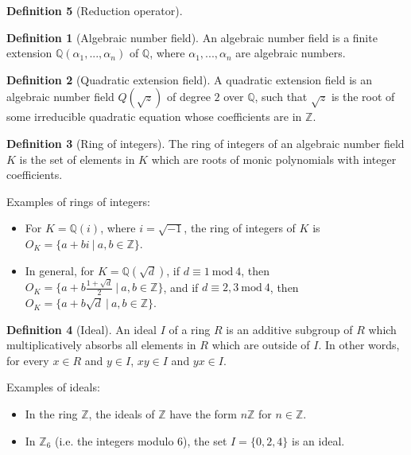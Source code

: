 \documentclass{article}
\theoremstyle{definition}
\newtheorem{definition}{Definition}[section]
\theoremstyle{theorem}
\theoremstyle{example}
\theoremstyle{corollary}
\begin{document}
\begin{definition}[Reduction operator]
\bigskip

\theoremstyle{definition}
\begin{definition}[Algebraic number field]
An algebraic number field is a finite extension \(\mathbb{Q}(\alpha_{1}, . . . , \alpha_{n})\) of \(\mathbb{Q}\), where \(\alpha_{1}, . . . , \alpha_{n}\) are algebraic numbers.
\end{definition}

\bigskip

\theoremstyle{definition}
\begin{definition}[Quadratic extension field]
A quadratic extension field is an algebraic number field \(Q(\sqrt{z})\) of degree \(2\) over \(\mathbb{Q}\), such that \(\sqrt{z}\) is the root of some irreducible quadratic equation whose coefficients are in \(\mathbb{Z}\).
\end{definition}

\bigskip

\theoremstyle{definition}
\begin{definition}[Ring of integers]
The ring of integers of an algebraic number field \(K\) is the set of elements in \(K\) which are roots of monic polynomials with integer coefficients.
\end{definition}

\bigskip

Examples of rings of integers:
\begin{itemize}
\item For \(K = \mathbb{Q}(i)\), where \(i = \sqrt{-1}\), the ring of integers of \(K\) is \(O_{K} = \{a + b i \ | \ a, b \in \mathbb{Z} \} \).
\item In general, for \(K = \mathbb{Q}(\sqrt{d})\), if \(d \equiv 1 \ \textrm{mod} \ 4\), then \(O_{K} = \{ a + b \frac{1 + \sqrt{d}}{2} \ | \ a, b \in \mathbb{Z} \} \), and if \(d \equiv 2, 3 \ \textrm{mod} \ 4\), then \(O_{K} = \{ a + b \sqrt{d} \ | \ a, b \in \mathbb{Z} \} \).
\end{itemize}

\bigskip

\theoremstyle{definition}
\begin{definition}[Ideal]
An ideal \(I\) of a ring \(R\) is an additive subgroup of \(R\) which multiplicatively absorbs all elements in \(R\) which are outside of \(I\). In other words, for every \(x \in R\) and \(y \in I\), \(xy \in I\) and \(yx \in I\).
\end{definition}

\bigskip

Examples of ideals:
\begin{itemize}
\item In the ring \(\mathbb{Z}\), the ideals of \(\mathbb{Z}\) have the form \(n\mathbb{Z}\) for \(n \in \mathbb{Z}\).
\item In \(\mathbb{Z}_{6}\) (i.e. the integers modulo \(6\)), the set \(I = \{ 0, 2, 4 \}\) is an ideal.
\end{itemize}


\end{definition}
\end{document}
